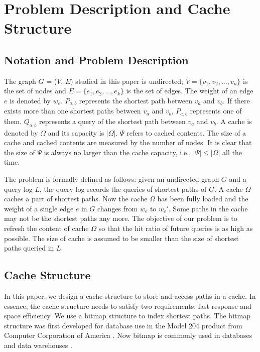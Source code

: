 \section{Problem Description and Cache Structure}
\label{sec:Cache Structure}
\subsection{Notation and Problem Description}
The graph $G$ = ($V$, $E$) studied in this paper is undirected; $V = \{v_1, v_2,..., v_n\}$ is the set of nodes and $E=\{e_1,e_2,...,e_k\}$ is the set of edges.
The weight of an edge $e$ is denoted by $w_e$.
$P_{a,b}$ represents the shortest path between $v_a$ and $v_b$. If there exists more than one shortest paths between $v_a$ and $v_b$, $P_{a,b}$ represents one of them.
$Q_{a,b}$ represents a query of the shortest path between $v_a$ and $v_b$.
A cache is denoted by $\Omega$ and its capacity is $|\Omega|$. $\Psi$ refers to cached contents. The size of a cache and cached contents are measured by the number of nodes. It is clear that the size of $\Psi$ is always no larger than the cache capacity, i.e., $|\Psi|\leq |\Omega|$ all the time.

The problem is formally defined as follows: given an undirected graph $G$ and a query log $L$, the query log records the queries of shortest paths of $G$.
A cache $\Omega$ caches a part of shortest paths. Now the cache $\Omega$ has been fully loaded and the weight of a single edge $e$ in $G$ changes from $w_e$ to $w_e'$. Some paths in the cache may not be the shortest paths any more.
The objective of our problem is to refresh the content of cache $\Omega$ so that the hit ratio of future queries is as high as possible. The size of cache is assumed to be smaller than the size of shortest paths queried in $L$.


\subsection{Cache Structure}
In this paper, we design a cache structure to store and access paths in a cache.
In essence, the cache structure needs to satisfy two requirements: fast response and space efficiency.
We use a bitmap structure to index shortest paths. The bitmap structure was first developed for database use in the Model 204 product from Computer Corporation of America \citep{ONeil1997}. Now bitmap is commonly used in databases and data warehouses \citep{Wang2016}.

